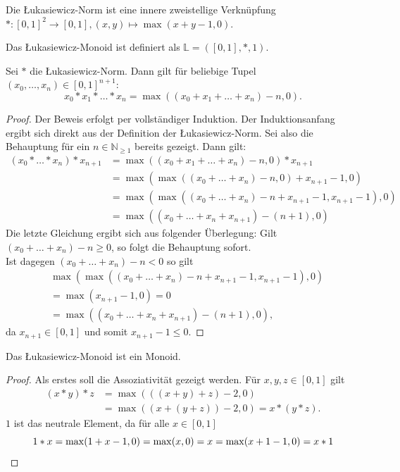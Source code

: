 \documentclass{article}
\begin{document}
\begin{definition}
  Die Łukasiewicz-Norm ist eine innere zweistellige Verknüpfung $\ast \colon [0, 1]^2 \to [0, 1], (x, y) \mapsto \max(x+y-1, 0)$.

  Das Łukasiewicz-Monoid ist definiert als $\mathbb{L} = ([0, 1], \ast, 1)$.
\end{definition}

\begin{theorem}
  Sei $\ast$ die Łukasiewicz-Norm.
  Dann gilt für beliebige Tupel \\ $(x_0, \dots, x_n) \in [0, 1]^{n+1}$:
  \begin{equation*}
    x_0 \ast x_1 \ast \dots \ast x_n = \max((x_0 + x_1 + \dots + x_n) - n, 0).
  \end{equation*}
\end{theorem}
\begin{proof}
  Der Beweis erfolgt per vollständiger Induktion.
  Der Induktionsanfang ergibt sich direkt aus der Definition der Łukasiewicz-Norm.
  Sei also die Behauptung für ein $n \in \mathbb{N}_{\geq 1}$ bereits gezeigt.
  Dann gilt:
  \begin{align*}
    (x_0 \ast \dots \ast x_n) \ast x_{n+1} &= \max((x_0 + x_1 + \dots + x_n) - n, 0) \ast x_{n+1} \\
    &= \max(\max((x_0 + \dots + x_n) - n, 0) + x_{n+1} - 1, 0) \\
    &= \max(\max((x_0 + \dots + x_n) - n + x_{n+1} - 1, x_{n+1} - 1), 0) \\
    &= \max((x_0 + \dots + x_n + x_{n+1}) - (n + 1), 0)
  \end{align*}
  Die letzte Gleichung ergibt sich aus folgender Überlegung:
  Gilt \\ $(x_0 + \dots + x_n) - n \geq 0$,
  so folgt die Behauptung sofort. \\
  Ist dagegen $(x_0 + \dots + x_n) - n < 0$ so gilt 
  \begin{align*}
    &\max(\max((x_0 + \dots + x_n) - n + x_{n+1} - 1, x_{n+1} - 1), 0) \\
    &= \max(x_{n+1} - 1, 0) = 0 \\
    &= \max((x_0 + \dots + x_n + x_{n+1}) - (n + 1), 0),
  \end{align*}
  da $x_{n+1} \in [0, 1]$ und somit $x_{n+1} - 1 \leq 0$.
\end{proof}

\begin{theorem}
  Das Łukasiewicz-Monoid ist ein Monoid.
\end{theorem}
\begin{proof}
  Als erstes soll die Assoziativität gezeigt werden.
  Für $x, y, z \in [0, 1]$ gilt
  \begin{align*}
    (x \ast y) \ast z &= \max(((x + y) + z) - 2, 0) \\
    &= \max((x + (y + z)) - 2, 0) = x \ast (y \ast z).
  \end{align*}
  $1$ ist das neutrale Element, da für alle $x \in [0, 1]$
  \begin{equation*}
    1 \ast x = \max(1 + x - 1, 0) = \max(x, 0) = x = \max(x + 1 - 1, 0) = x \ast 1 \qedhere
  \end{equation*}
\end{proof}
\end{document}
